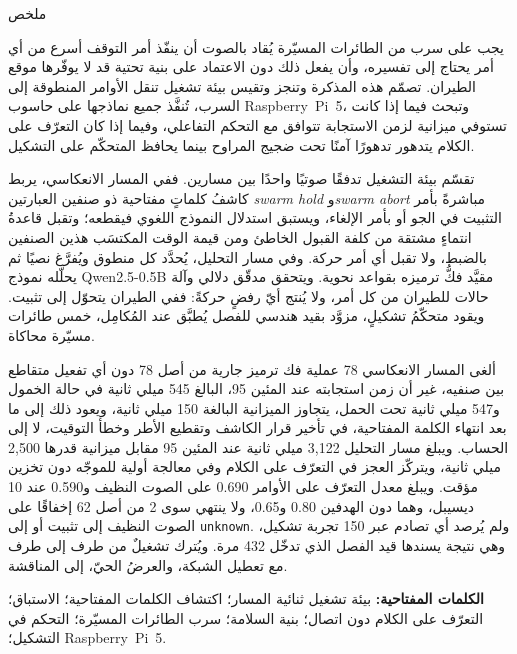 \thispagestyle{empty}
\vspace*{4cm}
\begin{center}{\Huge\bfseries \begin{Arabic}ملخص\end{Arabic}}\end{center}
\vskip 1cm
\begin{Arabic}
يجب على سرب من الطائرات المسيّرة يُقاد بالصوت أن ينفّذ أمر التوقف أسرع من أي أمر يحتاج إلى
تفسيره، وأن يفعل ذلك دون الاعتماد على بنية تحتية قد لا يوفّرها موقع الطيران. تصمّم هذه المذكرة
وتنجز وتقيس بيئة تشغيل تنقل الأوامر المنطوقة إلى السرب، تُنفَّذ جميع نماذجها على حاسوب
\textenglish{\mbox{Raspberry Pi 5}}، وتبحث فيما إذا كانت تستوفي ميزانية لزمن الاستجابة تتوافق مع
التحكم التفاعلي، وفيما إذا كان التعرّف على الكلام يتدهور تدهورًا آمنًا تحت ضجيج المراوح بينما
يحافظ المتحكّم على التشكيل.

\vspace{0.3cm}
تقسّم بيئة التشغيل تدفقًا صوتيًا واحدًا بين مسارين. ففي المسار الانعكاسي، يربط كاشفُ كلماتٍ
مفتاحية ذو صنفين العبارتين \textenglish{\emph{swarm hold}} و\textenglish{\emph{swarm abort}}
مباشرةً بأمر التثبيت في الجو أو بأمر الإلغاء، ويستبق استدلال النموذج اللغوي فيقطعه؛ وتقبل قاعدةُ
انتماءٍ مشتقة من كلفة القبول الخاطئ ومن قيمة الوقت المكتسَب هذين الصنفين بالضبط، ولا تقبل أي أمر
حركة. وفي مسار التحليل، يُحدَّد كل منطوق ويُفرَّغ نصيًا ثم يحلّله نموذج
\textenglish{\mbox{Qwen2.5-0.5B}} مقيَّد فكُّ ترميزه بقواعد نحوية. ويتحقق مدقّق دلالي وآلة حالات
للطيران من كل أمر، ولا يُنتج أيّ رفضٍ حركةً: ففي الطيران يتحوّل إلى تثبيت. ويقود متحكّمُ تشكيلٍ،
مزوَّد بقيد هندسي للفصل يُطبَّق عند المُكامِل، خمس طائرات مسيّرة محاكاة.

\vspace{0.3cm}
ألغى المسار الانعكاسي \textenglish{78} عملية فك ترميز جارية من أصل \textenglish{78} دون أي تفعيل
متقاطع بين صنفيه، غير أن زمن استجابته عند المئين \textenglish{95}، البالغ \textenglish{545} ميلي
ثانية في حالة الخمول و\textenglish{547} ميلي ثانية تحت الحمل، يتجاوز الميزانية البالغة
\textenglish{150} ميلي ثانية، ويعود ذلك إلى ما بعد انتهاء الكلمة المفتاحية، في تأخير قرار الكاشف
وتقطيع الأطر وخطأ التوقيت، لا إلى الحساب. ويبلغ مسار التحليل \textenglish{3{,}122} ميلي ثانية عند المئين \textenglish{95} مقابل ميزانية قدرها
\textenglish{2{,}500} ميلي ثانية، ويتركّز العجز في التعرّف على الكلام وفي معالجة أولية للموجّه دون
تخزين مؤقت. ويبلغ معدل التعرّف على الأوامر \textenglish{0.690} على الصوت النظيف
و\textenglish{0.590} عند \textenglish{10} ديسيبل، وهما دون الهدفين \textenglish{0.80}
و\textenglish{0.65}، ولا ينتهي سوى \textenglish{2} من أصل \textenglish{62} إخفاقًا على الصوت النظيف
إلى تثبيت أو إلى \textenglish{\texttt{unknown}}. ولم يُرصد أي تصادم عبر \textenglish{150} تجربة
تشكيل، وهي نتيجة يسندها قيد الفصل الذي تدخّل \textenglish{432} مرة. ويُترك تشغيلٌ من طرف إلى طرف
مع تعطيل الشبكة، والعرضُ الحيّ، إلى المناقشة.

\vspace{1cm}
\noindent\textbf{الكلمات المفتاحية:} بيئة تشغيل ثنائية المسار؛ اكتشاف الكلمات المفتاحية؛ الاستباق؛
التعرّف على الكلام دون اتصال؛ بنية السلامة؛ سرب الطائرات المسيّرة؛ التحكم في التشكيل؛
\textenglish{\mbox{Raspberry Pi 5}}.
\end{Arabic}
\newpage
